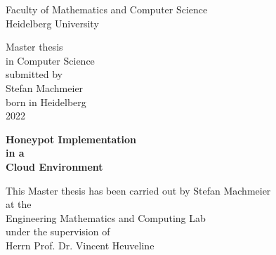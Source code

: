 \thispagestyle{empty}
\begin{center}
  \renewcommand{\baselinestretch}{2.00}
  \Large\sffamily
  Faculty of Mathematics and Computer Science\\
  \large Heidelberg University
  \par\vfill\normalfont
  Master thesis\\
  in Computer Science\\
  submitted by\\
  Stefan Machmeier\\
  born in Heidelberg\\
  2022
\end{center}
\newpage

\thispagestyle{empty}
\begin{center}
  \renewcommand{\baselinestretch}{2.00}
  \Large\bfseries\sffamily
    Honeypot Implementation\\
    in a\\
    Cloud Environment
  \par
  \vfill
  \large\normalfont
  This Master thesis has been carried out by Stefan Machmeier\\
  at the\\
  Engineering Mathematics and Computing Lab\\
  under the supervision of\\
  Herrn Prof. Dr. Vincent Heuveline
\end{center}\par
\vspace{5\baselineskip}

\renewcommand{\baselinestretch}{1.00}\normalsize
